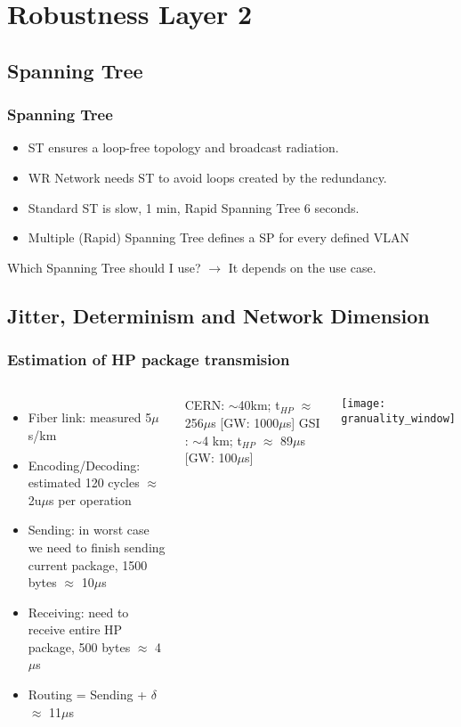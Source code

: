 \documentclass[]{beamer}
\begin{document}
\section{Robustness Layer 2}

\subsection{Spanning Tree}
\begin{frame}
  \frametitle{Spanning Tree}   %
  \begin{itemize}
	\item ST ensures a loop-free topology and broadcast radiation.
	\item WR Network needs ST to avoid loops created by the redundancy.
	\item Standard ST is slow, 1 min, Rapid Spanning Tree 6 seconds.
	\item Multiple (Rapid) Spanning Tree defines a SP for every defined VLAN
  \end{itemize}

Which Spanning Tree should I use? $\rightarrow$ It depends on the use case.

\end{frame}

\subsection{Jitter, Determinism and Network Dimension}

\begin{frame}
  \frametitle{Estimation of HP package transmision}   %
  \begin{columns}[c]
  \column{3in}  %
  \begin{itemize}
  \item Fiber link: measured 5$\mu$s/km
  \item Encoding/Decoding: estimated 120 cycles $\approx$ 2u$\mu$s per operation
  \item Sending: in worst case we need to finish sending current package, 1500 bytes $\approx$ 10$\mu$s
  \item Receiving: need to receive entire HP package, 500 bytes $\approx$ 4$\mu$s
  \item Routing = Sending + $\delta$ $\approx$ 11$\mu$s
  \end{itemize}

CERN: $\sim$40km; t$_{HP}$ $\approx$ 256$\mu$s [GW: 1000$\mu$s]
GSI : $\sim$4 km; t$_{HP}$ $\approx$  89$\mu$s [GW:  100$\mu$s]

  \column{3in}
  
  \texttt{[image: granuality\_window]}
  
  \end{columns}
\end{frame}
\end{document}
